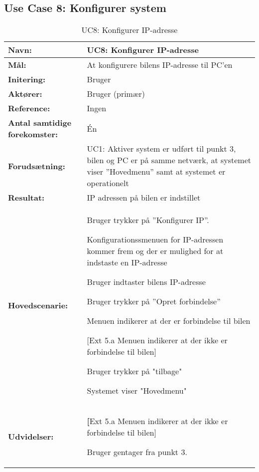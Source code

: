 \subsection{Use Case 8: Konfigurer system}
\begin{table}[h]
\begin{tabularx}{\textwidth}{| >{\raggedright\arraybackslash}p{3.3 cm} | >{\raggedright\arraybackslash}X |} \hline

\textbf{Navn:} 						& UC8: Konfigurer IP-adresse\\ \hline
\textbf{Mål:}						& At konfigurere bilens IP-adresse til PC'en\\ \hline
\textbf{Initering:}					& Bruger \\ \hline
\textbf{Aktører:} 					& Bruger (primær) \\ \hline
\textbf{Reference:} 					& Ingen\\ \hline
\textbf{Antal samtidige forekomster:} & Én \\ \hline
\textbf{Forudsætning:} 				& UC1: Aktiver system er udført til punkt 3, bilen og PC er på samme netværk, at systemet viser ''Hovedmenu'' samt at systemet er operationelt\\ \hline
\textbf{Resultat:}					& IP adressen på bilen er indstillet\\ \hline
\textbf{Hovedscenarie:}				& 

\begin{packed_enum}
\item Bruger trykker på ''Konfigurer IP''.
\item Konfigurationssmenuen for IP-adressen kommer frem og der er mulighed for at indstaste en IP-adresse
\item Bruger indtaster bilens IP-adresse
\item Bruger trykker på ''Opret forbindelse'' 
\item Menuen indikerer at der er forbindelse til bilen
	\begin{packed_item}\itemsep1pt \parskip0pt \parsep0pt
	\item {[}Ext 5.a Menuen indikerer at der ikke er forbindelse til bilen{]}
	\end{packed_item}
\item Bruger trykker på "tilbage"
\item Systemet viser "Hovedmenu"
\end{packed_enum} \\ \hline
\textbf{Udvidelser:}				&  
\textbf{[}Ext 5.a Menuen indikerer at der ikke er forbindelse til bilen{]}
	\begin{packed_enum}\itemsep1pt \parskip0pt \parsep0pt
	\item Bruger gentager fra punkt 3. 
	\end{packed_enum}
\\ \hline
\end{tabularx}
\caption{UC8: Konfigurer IP-adresse}
\label{tbl:UC8}
\end{table}